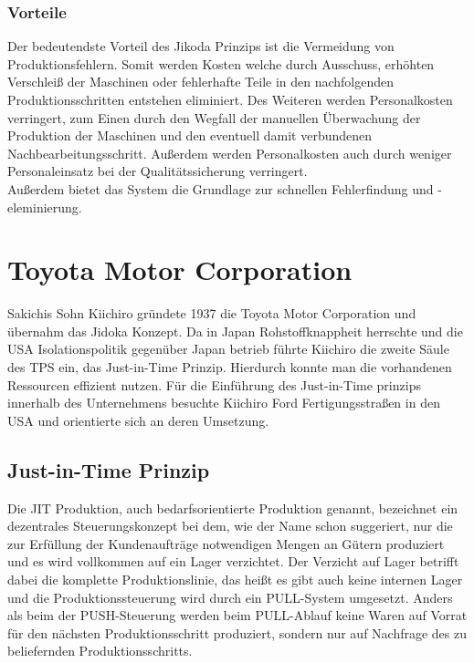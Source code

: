 \documentclass[00_ToyotaProduktionssystem.tex]{subfiles}
\begin{document}
\subsubsection{Vorteile}
Der bedeutendste Vorteil des Jikoda Prinzips ist die Vermeidung von Produktionsfehlern. Somit werden Kosten   welche durch Ausschuss, erhöhten Verschleiß der Maschinen oder fehlerhafte Teile in den nachfolgenden Produktionsschritten entstehen eliminiert. Des Weiteren werden Personalkosten verringert, zum Einen durch den Wegfall der manuellen Überwachung der Produktion der Maschinen und den eventuell damit verbundenen Nachbearbeitungsschritt. Außerdem werden Personalkosten auch durch weniger Personaleinsatz bei der Qualitätssicherung verringert.\\
Außerdem bietet das System die Grundlage zur schnellen Fehlerfindung und -eleminierung.
\section{Toyota Motor Corporation}
Sakichis Sohn Kiichiro gründete 1937 die Toyota Motor Corporation und übernahm das Jidoka Konzept. Da in Japan Rohstoffknappheit herrschte und die USA Isolationspolitik gegenüber Japan betrieb führte Kiichiro die zweite Säule des TPS ein, das Just-in-Time Prinzip. Hierdurch konnte man die vorhandenen Ressourcen effizient nutzen. Für die Einführung des Just-in-Time prinzips innerhalb des Unternehmens besuchte Kiichiro Ford Fertigungsstraßen in den USA und orientierte sich an deren Umsetzung.
\subsection{Just-in-Time Prinzip}
Die JIT Produktion, auch bedarfsorientierte Produktion genannt, bezeichnet ein dezentrales Steuerungskonzept bei dem,  wie der Name schon suggeriert, nur die zur Erfüllung der Kundenaufträge notwendigen Mengen an Gütern produziert und es wird vollkommen auf ein Lager verzichtet. Der Verzicht auf Lager betrifft dabei die komplette Produktionslinie, das heißt es gibt auch keine internen Lager und die Produktionssteuerung wird durch ein PULL-System umgesetzt. Anders als beim der PUSH-Steuerung werden beim PULL-Ablauf keine Waren auf Vorrat für den nächsten Produktionsschritt produziert, sondern nur auf Nachfrage des zu beliefernden Produktionsschritts.
\end{document}
